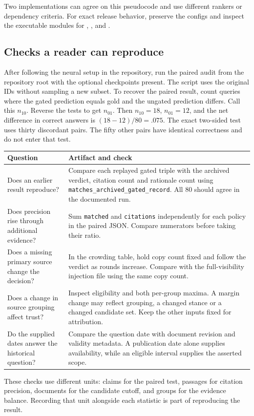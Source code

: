Two implementations can agree on this pseudocode and use different rankers or dependency criteria. For exact release behavior, preserve the configs and inspect the executable modules for , , and .

\subsection{Checks a reader can reproduce}
After following the neural setup in the repository, run the paired audit from the repository root with the optional checkpoints present. The script uses the original IDs without sampling a new subset. To recover the paired result, count queries where the gated prediction equals gold and the ungated prediction differs. Call this $n_{10}$. Reverse the tests to get $n_{01}$. Then $n_{10}=18$, $n_{01}=12$, and the net difference in correct answers is $(18-12)/80=.075$. The exact two-sided test uses thirty discordant pairs. The fifty other pairs have identical correctness and do not enter that test.

\begin{center}\small
\begin{tabularx}{\linewidth}{@{}p{.34\linewidth}X@{}}\toprule
Question & Artifact and check\\\midrule
Does an earlier result reproduce? & Compare each replayed gated triple with the archived verdict, citation count and rationale count using \texttt{matches\_archived\_gated\_record}. All 80 should agree in the documented run.\\
Does precision rise through additional evidence? & Sum \texttt{matched} and \texttt{citations} independently for each policy in the paired JSON. Compare numerators before taking their ratio.\\
Does a missing primary source change the decision? & In the crowding table, hold copy count fixed and follow the verdict as rounds increase. Compare with the full-visibility injection file using the same copy count.\\
Does a change in source grouping affect trust? & Inspect eligibility and both per-group maxima. A margin change may reflect grouping, a changed stance or a changed candidate set. Keep the other inputs fixed for attribution.\\
Do the supplied dates answer the historical question? & Compare the question date with document revision and validity metadata. A publication date alone supplies availability, while an eligible interval supplies the asserted scope.\\\bottomrule
\end{tabularx}
\end{center}

These checks use different units: claims for the paired test, passages for citation precision, documents for the candidate cutoff, and groups for the evidence balance. Recording that unit alongside each statistic is part of reproducing the result.
